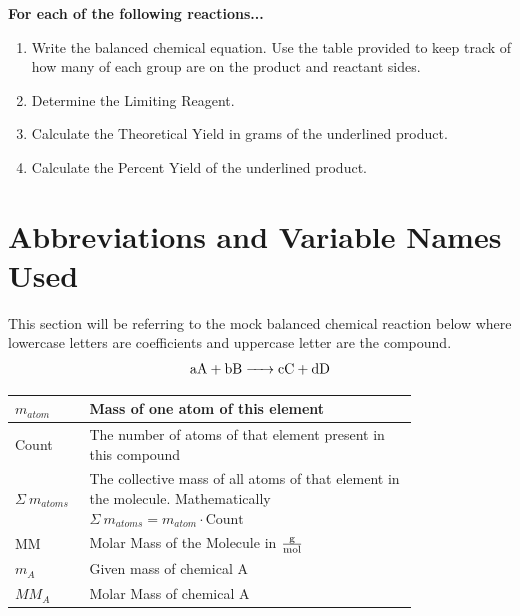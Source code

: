 \documentclass[12pt, oneside, letterpaper]{book}
\begin{document}
%
\pagestyle{fancy}
\renewcommand{\headrulewidth}{0pt}
\fancyhead{}
\fancyhead[R]{\thepage}
\fancyfoot{} %
\renewcommand{\footrulewidth}{0.1pt}
%
%
%
\textbf{For each of the following reactions...}
\begin{enumerate}[label=\alph*.]
    \item Write the balanced chemical equation. Use the table provided to keep track of how many of each group are on the product and reactant sides.
    \item Determine the Limiting Reagent.
    \item Calculate the Theoretical Yield in grams of the underlined product.
    \item Calculate the Percent Yield of the underlined product. 
\end{enumerate} 
\section{Abbreviations and Variable Names Used}

This section will be referring to the mock balanced chemical reaction below where lowercase letters are coefficients and uppercase letter are the compound.
\begin{gather*}
    \ce{aA + bB -> cC + dD}
\end{gather*}

\begin{table}[H]
\centering
\begin{tabular}{b{0.1\linewidth}|p{0.7\linewidth}} 
    $m_{atom}$ & Mass of one atom of this element \\
   \hline
    Count & The number of atoms of that element present in this compound \\
    \hline
    $\Sigma \ m_{atoms}$ & The collective mass of all atoms of that element in the molecule. Mathematically $\Sigma \ m_{atoms} = m_{atom} \cdot
    \text{Count}$ \\
    \hline
    MM & Molar Mass of the Molecule in $\qty{}{\frac{\gram}{\mole}}$ \\
    \hline
    $m_A$ & Given mass of chemical A \\
    \hline
    $MM_A$ & Molar Mass of chemical A\\
    \hline  
\end{tabular}
\end{table}
\end{document}
